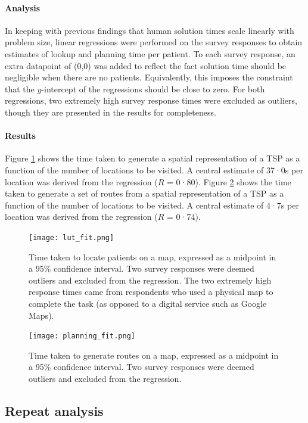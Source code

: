 \documentclass[review]{elsarticle}
\begin{document}
\paragraph{Analysis} In keeping with previous findings that human solution times scale linearly with problem size, linear regressions were performed on the survey responses to obtain estimates of lookup and planning time per patient. To each survey response, an extra datapoint of (0,0) was added to reflect the fact solution time should be negligible when there are no patients. Equivalently, this imposes the constraint that the $y$-intercept of the regressions should be close to zero. For both regressions, two extremely high survey response times were excluded as outliers, though they are presented in the results for completeness. 

\paragraph{Results} Figure \ref{lut_fit} shows the time taken to generate a spatial representation of a TSP as a function of the number of locations to be visited. A central estimate of 37·0s per location was derived from the regression ($R$ = 0·80). Figure \ref{planning_fit} shows the time taken to generate a set of routes from a spatial representation of a TSP as a function of the number of locations to be visited. A central estimate of 4·7s per location was derived from the regression ($R$ = 0·74). 

\begin{figure}[H]
\centering
\texttt{[image: lut\_fit.png]}
\caption{Time taken to locate patients on a map, expressed as a midpoint in a 95\% confidence interval. Two survey responses were deemed outliers and excluded from the regression. The two extremely high response times came from respondents who used a physical map to complete the task (as opposed to a digital service such as Google Maps).}
\label{lut_fit}
\end{figure}

\begin{figure}[H]
\centering
\texttt{[image: planning\_fit.png]}
\caption{Time taken to generate routes on a map, expressed as a midpoint in a 95\% confidence interval. Two survey responses were deemed outliers and excluded from the regression.}
\label{planning_fit}
\end{figure}

\subsection{Repeat analysis}
\end{document}
